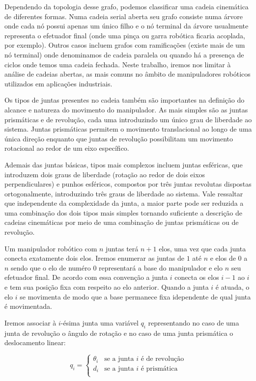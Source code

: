 Dependendo da topologia desse grafo, podemos classificar uma cadeia cinemática de diferentes formas. Numa cadeia serial aberta seu grafo consiste numa árvore onde cada nó possui apenas um único filho e o nó terminal da árvore usualmente representa o efetuador final (onde uma pinça ou garra robótica ficaria acoplada, por exemplo). Outros casos incluem grafos com ramificações (existe mais de um nó terminal) onde denominamos de cadeia paralela ou quando há a presença de ciclos onde temos uma cadeia fechada. Neste trabalho, iremos nos limitar à análise de cadeias abertas, as mais comuns no âmbito de manipuladores robóticos utilizados em aplicações industriais.

Os tipos de juntas presentes no cadeia também são importantes na definição do alcance e natureza do movimento do manipulador. As mais simples são as juntas prismáticas e de revolução, cada uma introduzindo um único grau de liberdade ao sistema. Juntas prismáticas permitem o movimento translacional ao longo de uma única direção enquanto que juntas de revolução possibilitam um movimento rotacional ao redor de um eixo específico. 

Ademais das juntas básicas, tipos mais complexos incluem juntas esféricas, que introduzem dois graus de liberdade (rotação ao redor de dois eixos perpendiculares) e punhos esféricos, compostos por três juntas revolutas dispostas ortogonalmente, introduzindo três graus de liberdade ao sistema. Vale ressaltar que independente da complexidade da junta, a maior parte pode ser reduzida a uma combinação dos dois tipos mais simples tornando suficiente a descrição de cadeias cinemáticas por meio de uma combinação de juntas prismáticas ou de revolução.

Um manipulador robótico com $n$ juntas terá $n + 1$ elos, uma vez que cada junta conecta exatamente dois elos. Iremos enumerar as juntas de $1$ até $n$ e elos de $0$ a $n$ sendo que o elo de numéro $0$ representará a base do manipulador e elo $n$ seu efetuador final. De acordo com essa convenção a junta $i$ conecta os elos $i - 1$ ao $i$ e tem sua posição fixa com respeito ao elo anterior. Quando a junta $i$ é atuada, o elo $i$ se movimenta de modo que a base permanece fixa idependente de qual junta é movimentada.

Iremos associar à $i$-ésima junta uma variável $q_i$ representando no caso de uma junta de revolução o ângulo de rotação e no caso de uma junta prismática o deslocamento linear:

\begin{equation}
  q_i =
  \begin{cases}
   \theta_i & \text{se a junta $i$ é de revolução} \\
   d_i & \text{se a junta $i$ é prismática} \\
  \end{cases}
\end{equation}

